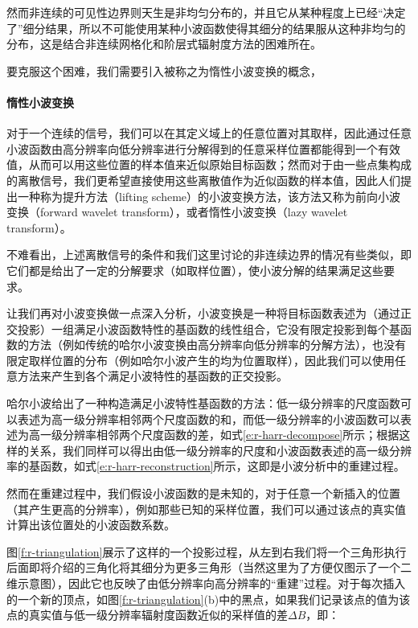 然而非连续的可见性边界则天生是非均匀分布的，并且它从某种程度上已经“决定了”细分结果，所以不可能使用某种小波函数使得其细分的结果服从这种非均匀的分布，这是结合非连续网格化和阶层式辐射度方法的困难所在。

要克服这个困难，我们需要引入被称之为惰性小波变换的概念，




\paragraph{惰性小波变换}
对于一个连续的信号，我们可以在其定义域上的任意位置对其取样，因此通过任意小波函数由高分辨率向低分辨率进行分解得到的任意采样位置都能得到一个有效值，从而可以用这些位置的样本值来近似原始目标函数；然而对于由一些点集构成的离散信号，我们更希望直接使用这些离散值作为近似函数的样本值，因此人们提出一种称为提升方法（lifting scheme）的小波变换方法，该方法又称为前向小波变换（forward wavelet transform），或者惰性小波变换（lazy wavelet transform）。

不难看出，上述离散信号的条件和我们这里讨论的非连续边界的情况有些类似，即它们都是给出了一定的分解要求（如取样位置），使小波分解的结果满足这些要求。

让我们再对小波变换做一点深入分析，小波变换是一种将目标函数表述为（通过正交投影）一组满足小波函数特性的基函数的线性组合，它没有限定投影到每个基函数的方法（例如传统的哈尔小波变换由高分辨率向低分辨率的分解方法），也没有限定取样位置的分布（例如哈尔小波产生的均为位置取样），因此我们可以使用任意方法来产生到各个满足小波特性的基函数的正交投影。

哈尔小波给出了一种构造满足小波特性基函数的方法：低一级分辨率的尺度函数可以表述为高一级分辨率相邻两个尺度函数的和，而低一级分辨率的小波函数可以表述为高一级分辨率相邻两个尺度函数的差，如式\ref{e:r-harr-decompose}所示；根据这样的关系，我们同样可以得出由低一级分辨率的尺度和小波函数表述的高一级分辨率的基函数，如式\ref{e:r-harr-reconstruction}所示，这即是小波分析中的重建过程。

然而在重建过程中，我们假设小波函数的是未知的，对于任意一个新插入的位置（其产生更高的分辨率），例如那些已知的采样位置，我们可以通过该点的真实值计算出该位置处的小波函数系数。

图\ref{f:r-triangulation}展示了这样的一个投影过程，从左到右我们将一个三角形执行后面即将介绍的三角化将其细分为更多三角形（当然这里为了方便仅图示了一个二维示意图），因此它也反映了由低分辨率向高分辨率的“重建”过程。对于每次插入的一个新的顶点，如图\ref{f:r-triangulation}(b)中的黑点，如果我们记录该点的值为该点的真实值与低一级分辨率辐射度函数近似的采样值的差$\Delta B$，即：

